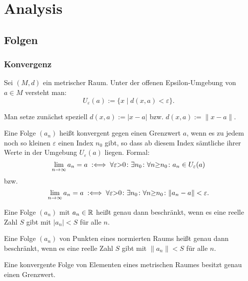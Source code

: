 
\chapter{Analysis}
\section{Folgen}
\subsection{Konvergenz}

\begin{Definition}%
Sei $(M,d)$ ein metrischer Raum. Unter der offenen Epsilon-Umgebung
von $a\in M$ versteht man:%
\[U_\varepsilon(a) := \{x\mid d(x,a)<\varepsilon\}.\]
\end{Definition}

\noindent
Man setze zunächst speziell $d(x,a):=|x-a|$ bzw. $d(x,a):=\|x-a\|$.

\begin{Definition}%
\label{def:lim}
Eine Folge $(a_n)$ heißt konvergent gegen einen Grenzwert $a$, wenn es
zu jedem noch so kleinen $\varepsilon$ einen Index $n_0$ gibt, so dass
ab diesem Index sämtliche ihrer Werte in der Umgebung
$U_\varepsilon(a)$ liegen. Formal:
\[\lim_{n\to\infty} a_n = a
\;:\Longleftrightarrow\; \forall\varepsilon{>}0\colon\exists n_0\colon\forall n{\ge}n_0\colon a_n\in U_\varepsilon(a)\]
bzw.
\[\lim_{n\to\infty} a_n = a
\;:\Longleftrightarrow\; \forall\varepsilon{>}0\colon\exists n_0\colon\forall n{\ge}n_0\colon \|a_n-a\|<\varepsilon.\]
\end{Definition}

\begin{Definition}%
\label{def:bseq}
Eine Folge $(a_n)$ mit $a_n\in\mathbb R$ heißt genau dann beschränkt,
wenn es eine reelle Zahl $S$ gibt mit $|a_n|<S$ für alle $n$.

Eine Folge $(a_n)$ von Punkten eines normierten Raums heißt genau
dann beschränkt, wenn es eine reelle Zahl $S$ gibt mit $\|a_n\|<S$
für alle $n$.
\end{Definition}

\begin{Satz}\newlinefirst
Eine konvergente Folge von Elementen eines metrischen Raumes
besitzt genau einen Grenzwert.
\end{Satz}

